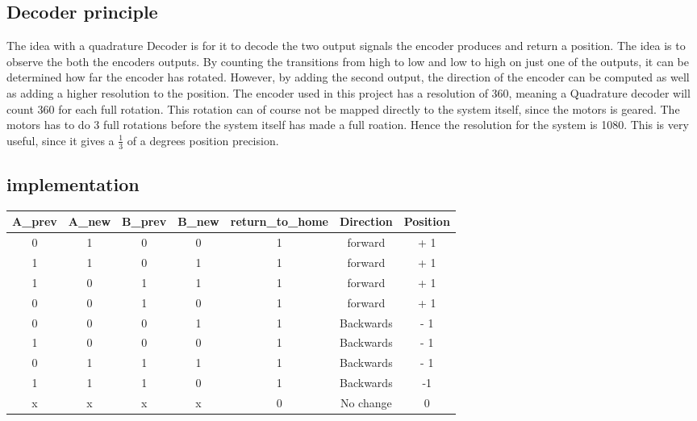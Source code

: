 \documentclass[../../../main]{subfiles}
\begin{document}
\subsection*{Decoder principle}
The idea with a quadrature Decoder is for it to decode the two output signals the encoder produces and return a position. The idea is to observe the both the encoders outputs. By counting the transitions from high to low and low to high on just one of the outputs, it can be determined how far the encoder has rotated. However, by adding the second output, the direction of the encoder can be computed as well as adding a higher resolution to the position. The encoder used in this project has a resolution of 360, meaning a Quadrature decoder will count 360 for each full rotation. This rotation can of course not be mapped directly to the system itself, since the motors is geared. The motors has to do 3 full rotations before the system itself has made a full roation. Hence the resolution for the system is 1080. This is very useful, since it gives a $\frac{1}{3}$ of a degrees position precision.
\subsection*{implementation}

\begin{tabular}{|c | c | c | c | c | c |c |}
\hline
 A\_prev & A\_new & B\_prev & B\_new & return\_to\_home & Direction & Position \\
 \hline
 0 & 1 & 0 & 0 & 1 & forward & + 1 \\
 1 & 1 & 0 & 1 & 1 & forward & + 1 \\
 1 & 0 & 1 & 1 & 1 & forward & + 1 \\
 0 & 0 & 1 & 0 & 1 & forward & + 1 \\
 0 & 0 & 0 & 1 & 1 & Backwards & - 1 \\
 1 & 0 & 0 & 0 & 1 & Backwards  & - 1 \\
 0 & 1 & 1 & 1 & 1 & Backwards & - 1 \\
 1 & 1 & 1 & 0 & 1 & Backwards & -1 \\
 x & x & x & x & 0 & No change & 0 \\
 \hline
\end{tabular}
\end{document}
